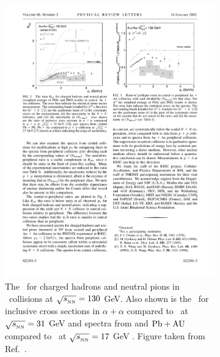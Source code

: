 \begin{figure}
\begin{subfigure}{.49\textwidth}
  \centering
\includegraphics[width=\textwidth]{figures/jetMeasurements/hadron_raa}
\caption{The \RAA\ for charged hadrons and neutral pions in \AuAu\ collisions at $\mbox{$\sqrt{s_{_\text{NN}}}$} = 130$ GeV.
Also shown is the \RAA\ for inclusive cross sections in $\alpha+\alpha$ compared to \pp\ at $\mbox{$\sqrt{s_{_\text{NN}}}$} = 31$ GeV \cite{ANGELIS1987213} and spectra from \pbpb and $\rm{Pb}+{\rm AU}$ compared to \pp\ at $\mbox{$\sqrt{s_{_\text{NN}}}$} = 17$ GeV \cite{PhysRevC.64.034901}.
Figure taken from Ref.~\cite{PhysRevLett.88.022301}.}
\label{fig:hadron_raa}
\end{subfigure} \qquad
\begin{subfigure}{.49\textwidth}
  \centering

\end{subfigure}
\end{figure}
